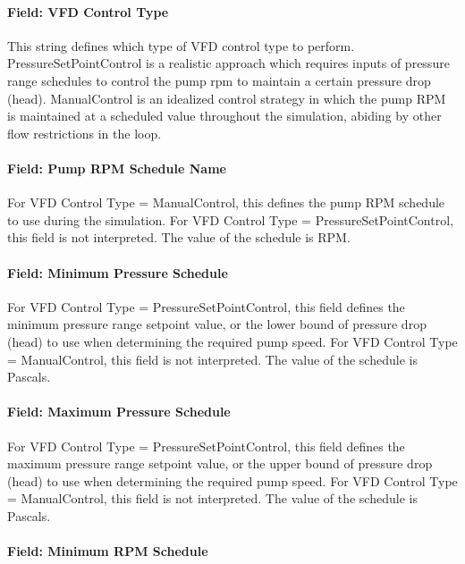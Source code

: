 \paragraph{Field: VFD Control Type}\label{field-vfd-control-type}

This string defines which type of VFD control type to perform. PressureSetPointControl is a realistic approach which requires inputs of pressure range schedules to control the pump rpm to maintain a certain pressure drop (head). ManualControl is an idealized control strategy in which the pump RPM is maintained at a scheduled value throughout the simulation, abiding by other flow restrictions in the loop.

\paragraph{Field: Pump RPM Schedule Name}\label{field-pump-rpm-schedule-name}

For VFD Control Type = ManualControl, this defines the pump RPM schedule to use during the simulation. For VFD Control Type = PressureSetPointControl, this field is not interpreted. The value of the schedule is RPM.

\paragraph{Field: Minimum Pressure Schedule}\label{field-minimum-pressure-schedule}

For VFD Control Type = PressureSetPointControl, this field defines the minimum pressure range setpoint value, or the lower bound of pressure drop (head) to use when determining the required pump speed. For VFD Control Type = ManualControl, this field is not interpreted. The value of the schedule is Pascals.

\paragraph{Field: Maximum Pressure Schedule}\label{field-maximum-pressure-schedule}

For VFD Control Type = PressureSetPointControl, this field defines the maximum pressure range setpoint value, or the upper bound of pressure drop (head) to use when determining the required pump speed. For VFD Control Type = ManualControl, this field is not interpreted. The value of the schedule is Pascals.

\paragraph{Field: Minimum RPM Schedule}\label{field-minimum-rpm-schedule}

